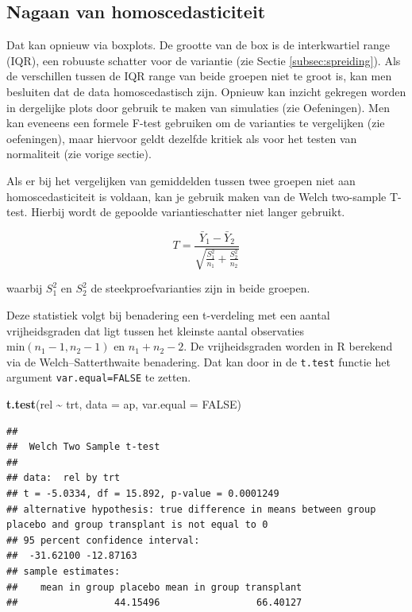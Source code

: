 \documentclass[
  12pt,dutch]{book}
\newenvironment{Shaded}{\begin{snugshade}}{\end{snugshade}}
\newcommand{\AttributeTok}[1]{\textcolor[rgb]{0.13,0.29,0.53}{#1}}
\newcommand{\ConstantTok}[1]{\textcolor[rgb]{0.56,0.35,0.01}{#1}}
\newcommand{\FunctionTok}[1]{\textcolor[rgb]{0.13,0.29,0.53}{\textbf{#1}}}
\newcommand{\NormalTok}[1]{#1}
\newcommand{\SpecialCharTok}[1]{\textcolor[rgb]{0.81,0.36,0.00}{\textbf{#1}}}
\theoremstyle{definition}
\theoremstyle{definition}
\theoremstyle{definition}
\theoremstyle{definition}
\theoremstyle{remark}
\begin{document}
\subsection{Nagaan van homoscedasticiteit}\label{nagaan-van-homoscedasticiteit}

Dat kan opnieuw via boxplots.
De grootte van de box is de interkwartiel range (IQR), een robuuste schatter voor de variantie (zie Sectie \ref{subsec:spreiding}).
Als de verschillen tussen de IQR range van beide groepen niet te groot is, kan men besluiten dat de data homoscedastisch zijn.
Opnieuw kan inzicht gekregen worden in dergelijke plots door gebruik te maken van simulaties (zie Oefeningen).
Men kan eveneens een formele F-test gebruiken om de varianties te vergelijken (zie oefeningen), maar hiervoor geldt dezelfde kritiek als voor het testen van normaliteit (zie vorige sectie).

Als er bij het vergelijken van gemiddelden tussen twee groepen niet aan homoscedasticiteit is voldaan, kan je gebruik maken van de Welch two-sample T-test.
Hierbij wordt de gepoolde variantieschatter niet langer gebruikt.

\[T =  \frac{\bar{Y}_1 - \bar{Y}_2}{\sqrt{\frac{S^2_1}{n_1}+\frac{S^2_2}{n_2}}}\]

waarbij \(S^2_1\) en \(S^2_2\) de steekproefvarianties zijn in beide groepen.

Deze statistiek volgt bij benadering een t-verdeling met een aantal vrijheidsgraden dat ligt tussen het kleinste aantal observaties \(\text{min}(n_1-1,n_2-1)\) en \(n_1+n_2-2\).
De vrijheidsgraden worden in R berekend via de Welch--Satterthwaite benadering.
Dat kan door in de \texttt{t.test} functie het argument \texttt{var.equal=FALSE} te zetten.

\begin{Shaded}
\begin{Highlighting}[]
\FunctionTok{t.test}\NormalTok{(rel }\SpecialCharTok{\textasciitilde{}}\NormalTok{ trt, }\AttributeTok{data =}\NormalTok{ ap, }\AttributeTok{var.equal =} \ConstantTok{FALSE}\NormalTok{)}
\end{Highlighting}
\end{Shaded}

\begin{verbatim}
## 
##  Welch Two Sample t-test
## 
## data:  rel by trt
## t = -5.0334, df = 15.892, p-value = 0.0001249
## alternative hypothesis: true difference in means between group placebo and group transplant is not equal to 0
## 95 percent confidence interval:
##  -31.62100 -12.87163
## sample estimates:
##    mean in group placebo mean in group transplant 
##                 44.15496                 66.40127
\end{verbatim}
\end{document}
